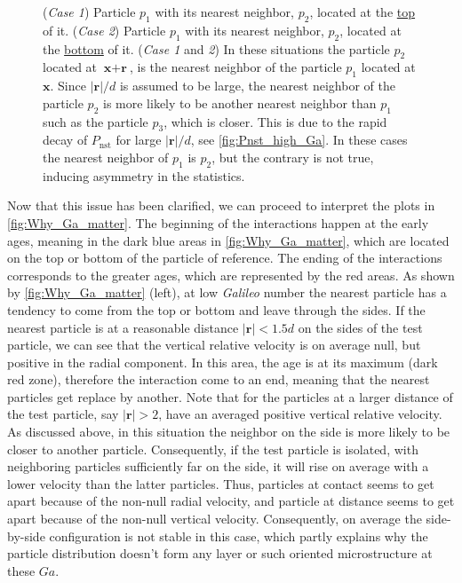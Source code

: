 \begin{figure}[h!]
{        (\textit{Case 1}) Particle $p_1$ with  its nearest neighbor, $p_2$, located at the \underline{top} of it. 
        (\textit{Case 2}) Particle $p_1$ with  its nearest neighbor, $p_2$, located at the \underline{bottom} of it. 
        (\textit{Case 1} and \textit{2})
        In these situations the particle $p_2$ located at $\textbf{x} + \textbf{r}$, is the nearest neighbor of the particle $p_1$ located at $\textbf{x}$. 
        Since $|\textbf{r}|/d$ is assumed to be large, the nearest neighbor of the particle $p_2$ is more likely to be another nearest neighbor than $p_1$ such as the particle $p_3$, which is closer.
        This is due to the rapid decay of $P_\text{nst}$ for large $|\textbf{r}|/d$, see \ref{fig:Pnst_high_Ga}. 
        In these cases the nearest neighbor of $p_1$ is $p_2$, but the contrary is not true, inducing asymmetry in the statistics.  
    }
    \label{fig:diagram_asym}
\end{figure}

Now that this issue has been clarified, we can proceed to interpret the plots in \ref{fig:Why_Ga_matter}.
The beginning of the interactions happen at the early ages, meaning in the dark blue areas in  \ref{fig:Why_Ga_matter}, which are located on the top or bottom of the particle of reference.
The ending of the interactions corresponds to the greater ages, which are represented by the red areas. 
As shown by \ref{fig:Why_Ga_matter} (left), at low \textit{Galileo} number the nearest particle has a tendency to come from the top or bottom and leave through the sides. 
If the nearest particle is at a reasonable distance $|\textbf{r}| < 1.5d$ on the sides of the test particle, we can see that the vertical relative velocity is on average null, but positive in the radial component.
In this area, the age is at its maximum (dark red zone), therefore the interaction come to an end, meaning that the nearest particles get replace by another. 
Note that for the particles at a larger distance of the test particle, say $|\textbf{r}|>2$, have an averaged positive vertical relative velocity. 
As discussed above, in this situation the neighbor on the side is more likely to be closer to another particle. 
Consequently, if the test particle is isolated, with neighboring particles sufficiently far on the side, it will rise on average with a lower velocity than the latter particles.
Thus, particles at contact  seems to get apart because of the non-null radial velocity, and particle at distance seems to get apart because of the non-null vertical velocity.  
Consequently, on average the side-by-side configuration is not stable in this case, which partly explains why the particle distribution doesn't form any layer or such oriented microstructure at these $Ga$.   


